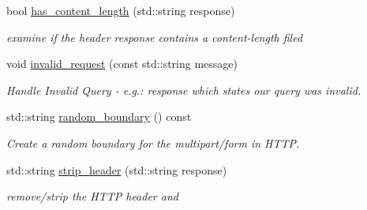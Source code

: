 \begin{DoxyCompactItemize}
bool \hyperlink{classrapp_1_1cloud_1_1asio__handler_af4895e356be3517fdd926e6e36b65553}{has\-\_\-content\-\_\-length} (std\-::string response)
\begin{DoxyCompactList}\small\item\em examine if the header response contains a {\ttfamily content-\/length} filed \end{DoxyCompactList}\item 
void \hyperlink{classrapp_1_1cloud_1_1asio__handler_ad1f041aedc0fd6ad3329dc50eaa91424}{invalid\-\_\-request} (const std\-::string message)
\begin{DoxyCompactList}\small\item\em Handle Invalid Query -\/ e.\-g.\-: response which states our query was invalid. \end{DoxyCompactList}\item 
std\-::string \hyperlink{classrapp_1_1cloud_1_1asio__handler_a613df0c84400a0799ad8d61c3ca0acdc}{random\-\_\-boundary} () const 
\begin{DoxyCompactList}\small\item\em Create a random boundary for the multipart/form in H\-T\-T\-P. \end{DoxyCompactList}\item 
std\-::string \hyperlink{classrapp_1_1cloud_1_1asio__handler_a4cf46a963a7810cda800370f65a9f749}{strip\-\_\-header} (std\-::string response)
\begin{DoxyCompactList}\small\item\em remove/strip the H\-T\-T\-P header and \end{DoxyCompactList}\end{DoxyCompactItemize}
